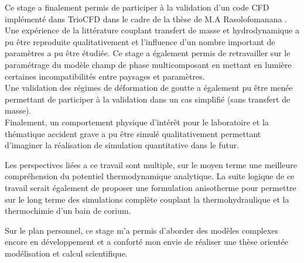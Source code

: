 Ce stage a finalement permis de participer à la validation d'un code CFD implémenté dans TrioCFD dans le cadre de la thèse de M.A Rasolofomanana \cite{rasolofomanana_modelisation_nodate}. Une expérience de la littérature couplant transfert de masse et hydrodynamique a pu être reproduite qualitativement et l'influence d'un nombre important de paramètres a pu être étudiée. Ce stage a également permis de retravailler sur le paramétrage du modèle champ de phase multicomposant en mettant en lumière certaines incompatibilités entre paysages et paramètres. \\
Une validation des régimes de déformation de goutte a également pu être menée permettant de participer à la validation dans un cas simplifié (sans transfert de masse). \\
Finalement, un comportement physique d'intérêt pour le laboratoire et la thématique accident grave a pu être simulé qualitativement permettant d'imaginer la réalisation de simulation quantitative dans le futur.

Les perspectives liées a ce travail sont multiple, sur le moyen terme une meilleure compréhension du potentiel thermodynamique analytique. La suite logique de ce travail serait également de proposer une formulation anisotherme pour permettre sur le long terme des simulations complète couplant la thermohydraulique et la thermochimie d'un bain de corium.

Sur le plan personnel, ce stage m'a permis d'aborder des modèles complexes encore en développement et a conforté mon envie de réaliser une thèse orientée modélisation et calcul scientifique.



